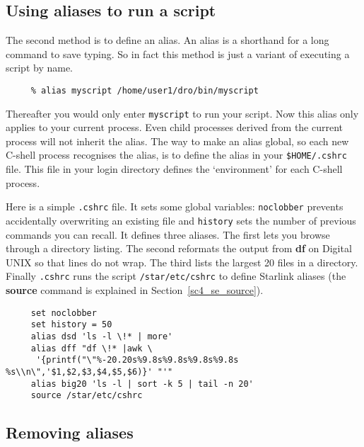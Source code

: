 \documentclass[twoside,11pt]{article}
\newcommand{\htmlref}[2]{#1}
\newcommand{\xlabel}[1]{}
\newcommand{\latexelsehtml}[2]{#1}
\newcommand{\latexelsehtml}[2]{#2}
\begin{document}
\subsection{\xlabel{sc4_se_aliases}Using aliases to run a script
\label{sc4_se_aliases}}

The second method is to define an \htmlref{{\sf alias}}{sc4_gl_alias}.
An alias is a shorthand for a long command to save typing.
So in fact this method is just a variant of executing a script by name.

\small
\begin{verbatim}
     % alias myscript /home/user1/dro/bin/myscript
\end{verbatim}
\normalsize
Thereafter you would only enter {\tt myscript} to run your script. Now
this alias only applies to your \htmlref{{\sf current
process}}{sc4_gl_cur}. Even child \htmlref{{\sf processes}}{sc4_gl_pro}
derived from the current process will not inherit the alias.  The way
to make an alias global, so each new C-shell process recognises the
alias, is to define the alias in your {\tt \$HOME/.cshrc} file.  This
file in your login directory defines the `environment' for each
C-shell process.

Here is a simple {\tt{.cshrc}} file.  It sets some global variables:
{\tt noclobber} prevents accidentally overwriting an existing file and
{\tt history} sets the number of previous commands you can recall.  It
defines three aliases.  The first lets you browse through a
directory listing.  The second reformats the output from {\bf df}
on Digital UNIX so that lines do not wrap.  The third lists the largest
20 files in a directory.  Finally {\tt .cshrc} runs the script
{\tt /star/etc/cshrc} to define Starlink aliases (the {\bf source}
command is explained \latexelsehtml{in
Section~\ref{sc4_se_source}).}{\htmlref{here}{sc4_se_source}).}

\small
\begin{verbatim}
     set noclobber
     set history = 50
     alias dsd 'ls -l \!* | more'
     alias dff "df \!* |awk \
      '{printf("\"%-20.20s%9.8s%9.8s%9.8s%9.8s %s\\n\",'$1,$2,$3,$4,$5,$6)}' "'"
     alias big20 'ls -l | sort -k 5 | tail -n 20'
     source /star/etc/cshrc    
\end{verbatim}
\normalsize

\subsection{\xlabel{sc4_se_unalias}Removing aliases
\label{sc4_se_unalias}}
\end{document}
